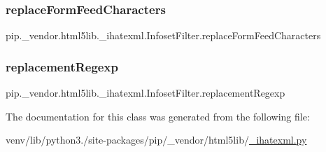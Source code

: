 \subsubsection{\texorpdfstring{replace\+Form\+Feed\+Characters}{replaceFormFeedCharacters}}
{\footnotesize\ttfamily pip.\+\_\+vendor.\+html5lib.\+\_\+ihatexml.\+Infoset\+Filter.\+replace\+Form\+Feed\+Characters}

\mbox{\label{classpip_1_1__vendor_1_1html5lib_1_1__ihatexml_1_1InfosetFilter_a59f5b7ba1836605473a3d2a499a914c8}} 
\subsubsection{\texorpdfstring{replacement\+Regexp}{replacementRegexp}}
{\footnotesize\ttfamily pip.\+\_\+vendor.\+html5lib.\+\_\+ihatexml.\+Infoset\+Filter.\+replacement\+Regexp\hspace{0.3cm}{\ttfamily [static]}}



The documentation for this class was generated from the following file\+:\begin{DoxyCompactItemize}
\item 
venv/lib/python3./site-\/packages/pip/\+\_\+vendor/html5lib/\hyperlink{__ihatexml_8py}{\+\_\+ihatexml.\+py}\end{DoxyCompactItemize}

